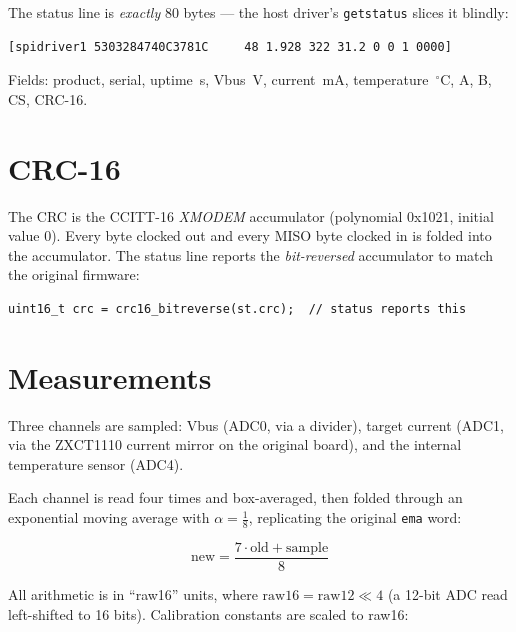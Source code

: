 \documentclass[11pt,a4paper]{article}
\begin{document}
The status line is \emph{exactly} 80 bytes --- the host driver's
\texttt{getstatus} slices it blindly:

\begin{lstlisting}[style=proto]
[spidriver1 5303284740C3781C     48 1.928 322 31.2 0 0 1 0000]
\end{lstlisting}

Fields: product, serial, uptime~s, Vbus~V, current~mA, temperature~$^\circ$C,
A, B, CS, CRC-16.

\section{CRC-16}

The CRC is the CCITT-16 \emph{XMODEM} accumulator (polynomial 0x1021, initial
value 0). Every byte clocked out and every MISO byte clocked in is folded
into the accumulator. The status line reports the \emph{bit-reversed}
accumulator to match the original firmware:

\begin{lstlisting}[style=c]
uint16_t crc = crc16_bitreverse(st.crc);  // status reports this
\end{lstlisting}

\section{Measurements}

Three channels are sampled: Vbus (ADC0, via a divider), target current
(ADC1, via the ZXCT1110 current mirror on the original board), and the
internal temperature sensor (ADC4).

Each channel is read four times and box-averaged, then folded through an
exponential moving average with $\alpha=\tfrac18$, replicating the original
\texttt{ema} word:

\begin{equation}
  \text{new} = \frac{7\cdot\text{old} + \text{sample}}{8}
\end{equation}

All arithmetic is in ``raw16'' units, where $\text{raw16}=\text{raw12}\ll 4$
(a 12-bit ADC read left-shifted to 16 bits). Calibration constants are
scaled to raw16:
\end{document}

